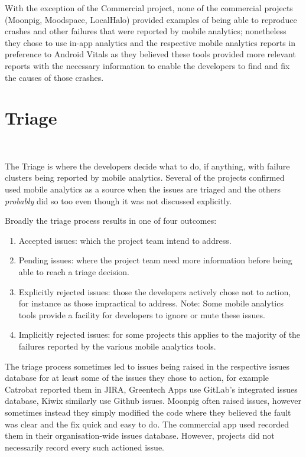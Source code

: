 With the exception of the Commercial project, none of the commercial projects (Moonpig, Moodspace, LocalHalo) provided examples of being able to reproduce crashes and other failures that were reported by mobile analytics; nonetheless they chose to use in-app analytics and the respective mobile analytics reports in preference to Android Vitals as they believed these tools provided more relevant reports with the necessary information to enable the developers to find and fix the causes of those crashes.

\section{Triage}~\label{aiu-triage-section}

The Triage is where the developers decide what to do, if anything, with failure clusters being reported by mobile analytics. Several of the projects confirmed used mobile analytics as a source when the issues are triaged and the others \textit{probably} did so too even though it was not discussed explicitly.

Broadly the triage process results in one of four outcomes:
\begin{enumerate}
    \item Accepted issues: which the project team intend to address.
    \item Pending issues: where the project team need more information before being able to reach a triage decision.
    \item Explicitly rejected issues: those the developers actively chose not to action, for instance as those impractical to address. Note: Some mobile analytics tools provide a facility for developers to ignore or mute these issues.
    \item Implicitly rejected issues: for some projects this applies to the majority of the failures reported by the various mobile analytics tools.
\end{enumerate}

The triage process sometimes led to issues being raised in the respective issues database for at least some of the issues they chose to action, for example Catrobat reported them in JIRA, Greentech Apps use GitLab's integrated issues database, Kiwix similarly use Github issues. Moonpig often raised issues, however sometimes instead they simply modified the code where they believed the fault was clear and the fix quick and easy to do. The commercial app used recorded them in their organisation-wide issues database. However, projects did not necessarily record every such actioned issue. 

